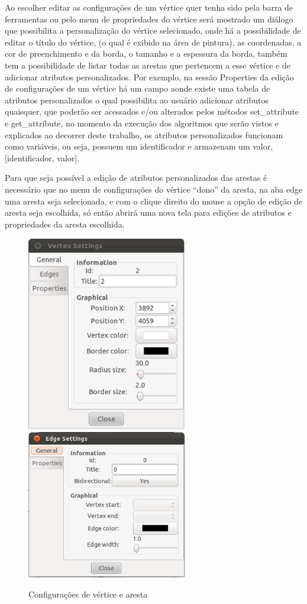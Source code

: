\documentclass[a4paper]{abnt}
\begin{document}
Ao escolher editar as configurações de um vértice quer tenha sido pela barra de ferramentas ou pelo menu de propriedades do vértice será mostrado um diálogo que possibilita a personalização do vértice selecionado, onde há a possibilidade de editar o título do vértice, (o qual é exibido na área de pintura), as coordenadas, a cor de preenchimento e da borda, o tamanho e a espessura da borda, também tem a possibilidade de listar todas as arestas que pertencem a esse vértice e de adicionar atributos personalizados. Por exemplo, na sessão Properties da edição de configurações de um vértice há um campo aonde existe uma tabela de atributos personalizados o qual possibilita ao usuário adicionar atributos quaisquer, que poderão ser acessados e/ou alterados pelos métodos set\_attribute e get\_attribute, no momento da execução dos algoritmos que serão vistos e explicados ao decorrer deste trabalho, os atributos personalizados funcionam como variáveis, ou seja, possuem um identificador e armazenam um valor, [identificador, valor].

Para que seja possível a edição de atributos personalizados das arestas é necessário que no menu de configurações do vértice “dono” da aresta, na aba edge uma aresta seja selecionada, e com o clique direito do mouse a opção de edição de aresta seja escolhida, só então abrirá uma nova tela para edições de atributos e propriedades da aresta escolhida.

\begin{figure}[htb]
    \centering
	\includegraphics[width=7cm]{vertex_settings.png}
    \includegraphics[width=7cm]{edge_settings.png}
	\caption{Configurações de vértice e aresta}
	\label{img_vertex_and_edges_settings}
\end{figure}
\end{document}
